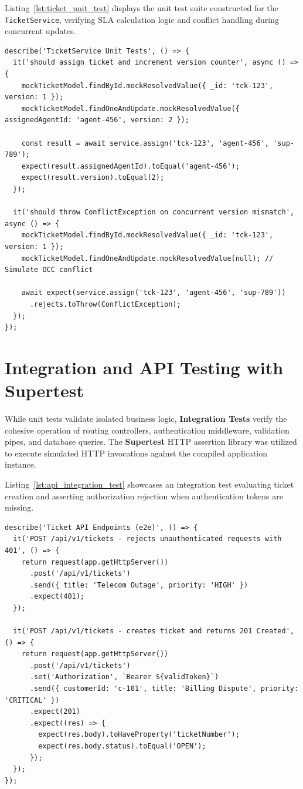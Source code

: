 Listing~\ref{lst:ticket_unit_test} displays the unit test suite constructed for the \texttt{TicketService}, verifying SLA calculation logic and conflict handling during concurrent updates.

\begin{lstlisting}[caption={Unit Test for Ticket Assignment and Optimistic Lock Mismatch.}, label={lst:ticket_unit_test}]
describe('TicketService Unit Tests', () => {
  it('should assign ticket and increment version counter', async () => {
    mockTicketModel.findById.mockResolvedValue({ _id: 'tck-123', version: 1 });
    mockTicketModel.findOneAndUpdate.mockResolvedValue({ assignedAgentId: 'agent-456', version: 2 });

    const result = await service.assign('tck-123', 'agent-456', 'sup-789');
    expect(result.assignedAgentId).toEqual('agent-456');
    expect(result.version).toEqual(2);
  });

  it('should throw ConflictException on concurrent version mismatch', async () => {
    mockTicketModel.findById.mockResolvedValue({ _id: 'tck-123', version: 1 });
    mockTicketModel.findOneAndUpdate.mockResolvedValue(null); // Simulate OCC conflict

    await expect(service.assign('tck-123', 'agent-456', 'sup-789'))
      .rejects.toThrow(ConflictException);
  });
});
\end{lstlisting}

\section{Integration and API Testing with Supertest}
\label{sec:test_integration}

While unit tests validate isolated business logic, \textbf{Integration Tests} verify the cohesive operation of routing controllers, authentication middleware, validation pipes, and database queries. The \textbf{Supertest} HTTP assertion library was utilized to execute simulated HTTP invocations against the compiled application instance.

Listing~\ref{lst:api_integration_test} showcases an integration test evaluating ticket creation and asserting authorization rejection when authentication tokens are missing.

\begin{lstlisting}[caption={API Integration Test Using Supertest.}, label={lst:api_integration_test}]
describe('Ticket API Endpoints (e2e)', () => {
  it('POST /api/v1/tickets - rejects unauthenticated requests with 401', () => {
    return request(app.getHttpServer())
      .post('/api/v1/tickets')
      .send({ title: 'Telecom Outage', priority: 'HIGH' })
      .expect(401);
  });

  it('POST /api/v1/tickets - creates ticket and returns 201 Created', () => {
    return request(app.getHttpServer())
      .post('/api/v1/tickets')
      .set('Authorization', `Bearer ${validToken}`)
      .send({ customerId: 'c-101', title: 'Billing Dispute', priority: 'CRITICAL' })
      .expect(201)
      .expect((res) => {
        expect(res.body).toHaveProperty('ticketNumber');
        expect(res.body.status).toEqual('OPEN');
      });
  });
});
\end{lstlisting}

